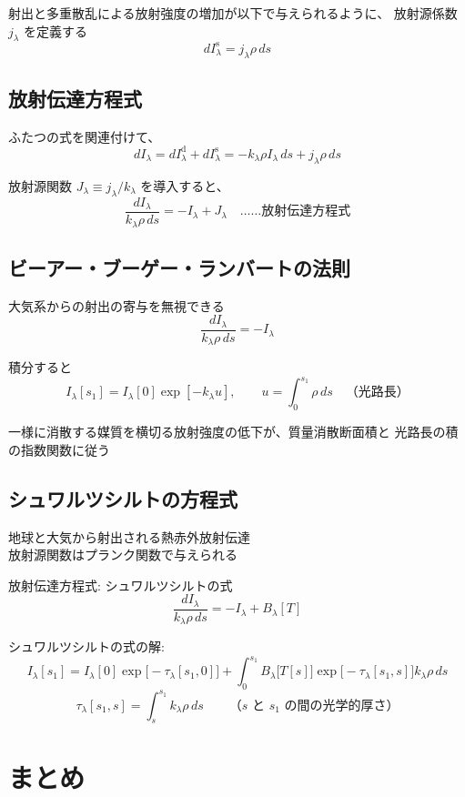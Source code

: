\documentclass[article]{dennou777}
\begin{document}
射出と多重散乱による放射強度の増加が以下で与えられるように、
放射源係数 $j_\lambda$ を定義する
\[dI_\lambda^\mathrm{s}=j_\lambda\rho\,ds\]

\subsection{放射伝達方程式}
ふたつの式を関連付けて、
\[dI_\lambda=dI_\lambda^\mathrm{d}+dI_\lambda^\mathrm{s}=-k_\lambda\rho I_\lambda\,ds+j_\lambda\rho\,ds\]

放射源関数 $J_\lambda\equiv j_\lambda/k_\lambda$ を導入すると、
\[\frac{dI_\lambda}{k_\lambda\rho\,ds}=-I_\lambda+J_\lambda\quad\text{……放射伝達方程式}\]

\subsection{ビーアー・ブーゲー・ランバートの法則}
大気系からの射出の寄与を無視できる
\[\frac{dI_\lambda}{k_\lambda\rho\,ds}=-I_\lambda\]

積分すると
\[I_\lambda[s_1]=I_\lambda[0]\exp[-k_\lambda u],\qquad u=\int^{s_1}_0\rho\,ds\quad\text{（光路長）}\]

一様に消散する媒質を横切る放射強度の低下が、質量消散断面積と
光路長の積の指数関数に従う

\subsection{シュワルツシルトの方程式}
地球と大気から射出される熱赤外放射伝達\\
放射源関数はプランク関数で与えられる

放射伝達方程式: シュワルツシルトの式
\[\frac{dI_\lambda}{k_\lambda\rho\,ds}=-I_\lambda+B_\lambda[T]\]

シュワルツシルトの式の解:
\[I_\lambda[s_1]=I_\lambda[0]\exp\bigl[-\tau_\lambda[s_1,0]\bigr]+
	\int^{s_1}_{0}B_\lambda\bigl[T[s]\bigr]\exp\bigl[-\tau_\lambda[s_1,s]\bigr]k_\lambda\rho\,ds\]
\[\tau_\lambda[s_1,s]=\int^{s_1}_s k_\lambda\rho\,ds\qquad\text{（$s$ と $s_1$ の間の光学的厚さ）}\]

\section{まとめ}
\end{document}
